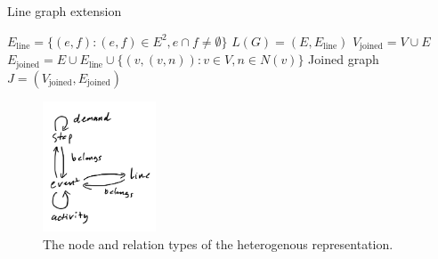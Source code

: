 \documentclass[english, 12pt, a4paper, sci, utf8, a-2b, online]{aaltothesis}
\begin{document}
\begin{algorithm}

    \caption{Line graph extension}
    \label{alg:line-graph}
    \begin{algorithmic}
        \State $E_{\text{line}} = \{(e, f) : (e, f) \in E^2, e\cap f \neq \emptyset\}$
        \State $L(G) = (E, E_{\text{line}})$ 
        \State $V_\text{joined} = V \cup E$
        \State $E_\text{joined} = E \cup E_\text{line} \cup \{(v, (v, n)) : v \in V, n \in N(v)\}$
        \State Joined graph $J = (V_\text{joined}, E_\text{joined})$
    \end{algorithmic}
    
\end{algorithm}
 

\begin{figure}
    \centering
    \includegraphics[width=0.3\textwidth]{figures/hetero-graph-relations.jpg}
    \caption{The node and relation types of the heterogenous representation.}
    \label{fig:hetero-relations}
\end{figure}
\end{document}
